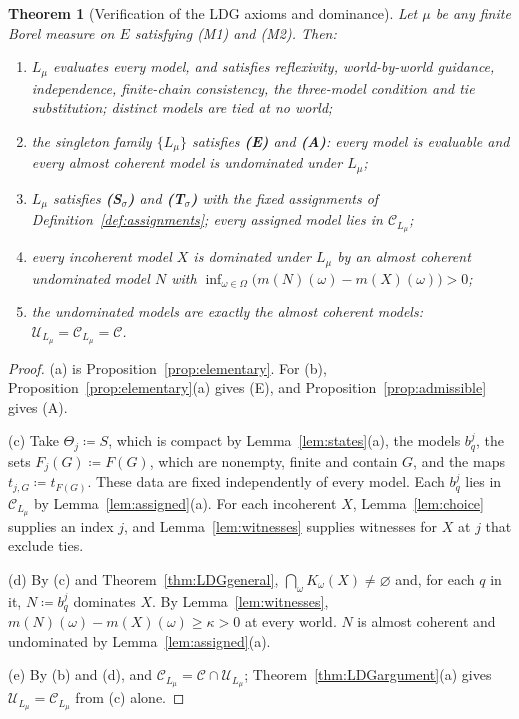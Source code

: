 \documentclass[11pt]{article}
\newtheorem{theorem}{Theorem}[section]
\theoremstyle{definition}
\newcommand{\C}{\mathcal C}
\newcommand{\U}{\mathcal U}
\newcommand{\Lmu}{L_\mu}
\begin{document}
\begin{theorem}[Verification of the LDG axioms and dominance]\label{thm:main}
Let $\mu$ be any finite Borel measure on $E$ satisfying (M1) and (M2). Then:
\begin{enumerate}[label=(\alph*)]
\item $\Lmu$ evaluates every model, and satisfies reflexivity, world-by-world guidance, independence, finite-chain consistency, the three-model condition and tie substitution; distinct models are tied at no world;
\item the singleton family $\{\Lmu\}$ satisfies \textbf{(E)} and \textbf{(A)}: every model is evaluable and every almost coherent model is undominated under $\Lmu$;
\item $\Lmu$ satisfies \textbf{(S$_\sigma$)} and \textbf{(T$_\sigma$)} with the fixed assignments of Definition~\ref{def:assignments}; every assigned model lies in $\C_{\Lmu}$;
\item every incoherent model $X$ is dominated under $\Lmu$ by an almost coherent undominated model $N$ with $\inf_{\omega\in\Omega}\bigl(m(N)(\omega)-m(X)(\omega)\bigr)>0$;
\item the undominated models are exactly the almost coherent models: $\U_{\Lmu}=\C_{\Lmu}=\C$.
\end{enumerate}
\end{theorem}
\begin{proof}
(a) is Proposition~\ref{prop:elementary}. For (b), Proposition~\ref{prop:elementary}(a) gives (E), and Proposition~\ref{prop:admissible} gives (A).

(c) Take $\Theta_j\coloneqq S$, which is compact by Lemma~\ref{lem:states}(a), the models $b^j_q$, the sets $F_j(G)\coloneqq F(G)$, which are nonempty, finite and contain $G$, and the maps $t_{j,G}\coloneqq t_{F(G)}$. These data are fixed independently of every model. Each $b^j_q$ lies in $\C_{\Lmu}$ by Lemma~\ref{lem:assigned}(a). For each incoherent $X$, Lemma~\ref{lem:choice} supplies an index $j$, and Lemma~\ref{lem:witnesses} supplies witnesses for $X$ at $j$ that exclude ties.

(d) By (c) and Theorem~\ref{thm:LDGgeneral}, $\bigcap_\omega K_\omega(X)\ne\varnothing$ and, for each $q$ in it, $N\coloneqq b^j_q$ dominates $X$. By Lemma~\ref{lem:witnesses}, $m(N)(\omega)-m(X)(\omega)\ge\kappa>0$ at every world. $N$ is almost coherent and undominated by Lemma~\ref{lem:assigned}(a).

(e) By (b) and (d), and $\C_{\Lmu}=\C\cap\U_{\Lmu}$; Theorem~\ref{thm:LDGargument}(a) gives $\U_{\Lmu}=\C_{\Lmu}$ from (c) alone.
\end{proof}
\end{document}
